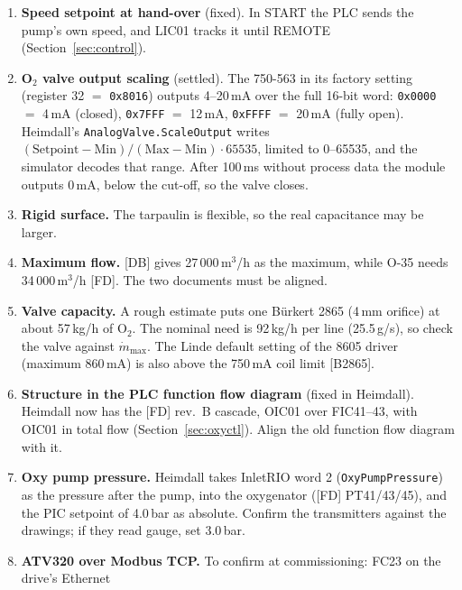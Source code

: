 \documentclass[11pt]{article}
\begin{document}
\begin{enumerate}
        HeartbeatElapsed are not mapped; Limit*, DisplayName and Description are BOOL instead of
        REAL/STRING; each pump has its own namespace URI. Confirm against the delivered Framo
        PLCs. The simulator follows the Data Source.
  \item \textbf{Speed setpoint at hand-over} (fixed). In START the PLC sends the pump's own
        speed, and LIC01 tracks it until REMOTE (Section~\ref{sec:control}).
  \item \textbf{O$_2$ valve output scaling} (settled). The 750-563 in its factory setting
        (register 32 $=$ \texttt{0x8016}) outputs 4--20\,mA over the full 16-bit word:
        \texttt{0x0000} $=$ 4\,mA (closed), \texttt{0x7FFF} $=$ 12\,mA, \texttt{0xFFFF} $=$
        20\,mA (fully open). Heimdall's \texttt{AnalogValve.ScaleOutput} writes
        $(\text{Setpoint}-\text{Min})/(\text{Max}-\text{Min})\cdot 65535$, limited to 0--65535, and
        the simulator decodes that range. After 100\,ms without process data the module outputs
        0\,mA, below the cut-off, so the valve closes.
  \item \textbf{Rigid surface.} The tarpaulin is flexible, so the real capacitance may be larger.
  \item \textbf{Maximum flow.} [DB] gives 27\,000\,m$^3$/h as the maximum, while O-35 needs
        34\,000\,m$^3$/h [FD]. The two documents must be aligned.
  \item \textbf{Valve capacity.} A rough estimate puts one Bürkert 2865 (4\,mm orifice) at about
        57\,kg/h of O$_2$. The nominal need is 92\,kg/h per line (25.5\,g/s), so check the
        valve against $\dot m_\text{max}$. The Linde default setting of the 8605 driver
        (maximum 860\,mA) is also above the 750\,mA coil limit [B2865].
  \item \textbf{Structure in the PLC function flow diagram} (fixed in Heimdall). Heimdall now has
        the [FD] rev.~B cascade, OIC01 over FIC41--43, with OIC01 in total flow
        (Section~\ref{sec:oxyctl}). Align the old function flow diagram with it.
  \item \textbf{Oxy pump pressure.} Heimdall takes InletRIO word 2 (\texttt{OxyPumpPressure}) as the
        pressure after the pump, into the oxygenator ([FD] PT41/43/45), and the PIC setpoint of
        4.0\,bar as absolute. Confirm the transmitters against the drawings; if they read gauge,
        set 3.0\,bar.
  \item \textbf{ATV320 over Modbus TCP.} To confirm at commissioning: FC23 on the drive's Ethernet

\end{enumerate}
\end{document}
